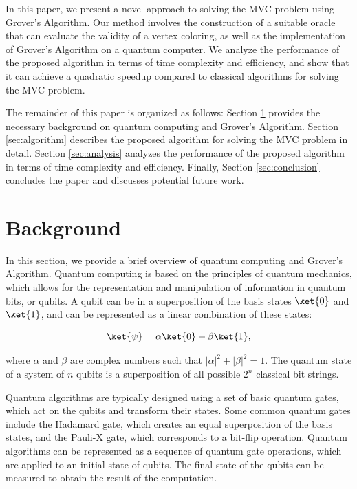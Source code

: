 In this paper, we present a novel approach to solving the MVC problem using Grover's Algorithm. Our method involves the construction of a suitable oracle that can evaluate the validity of a vertex coloring, as well as the implementation of Grover's Algorithm on a quantum computer. We analyze the performance of the proposed algorithm in terms of time complexity and efficiency, and show that it can achieve a quadratic speedup compared to classical algorithms for solving the MVC problem.

The remainder of this paper is organized as follows: Section \ref{sec:background} provides the necessary background on quantum computing and Grover's Algorithm. Section \ref{sec:algorithm} describes the proposed algorithm for solving the MVC problem in detail. Section \ref{sec:analysis} analyzes the performance of the proposed algorithm in terms of time complexity and efficiency. Finally, Section \ref{sec:conclusion} concludes the paper and discusses potential future work.

\section{Background}
\label{sec:background}

In this section, we provide a brief overview of quantum computing and Grover's Algorithm. Quantum computing is based on the principles of quantum mechanics, which allows for the representation and manipulation of information in quantum bits, or qubits. A qubit can be in a superposition of the basis states $\ket{0}$ and $\ket{1}$, and can be represented as a linear combination of these states:

\begin{equation}
\ket{\psi} = \alpha\ket{0} + \beta\ket{1},
\end{equation}

where $\alpha$ and $\beta$ are complex numbers such that $|\alpha|^2 + |\beta|^2 = 1$. The quantum state of a system of $n$ qubits is a superposition of all possible $2^n$ classical bit strings.

Quantum algorithms are typically designed using a set of basic quantum gates, which act on the qubits and transform their states. Some common quantum gates include the Hadamard gate, which creates an equal superposition of the basis states, and the Pauli-X gate, which corresponds to a bit-flip operation. Quantum algorithms can be represented as a sequence of quantum gate operations, which are applied to an initial state of qubits. The final state of the qubits can be measured to obtain the result of the computation.

